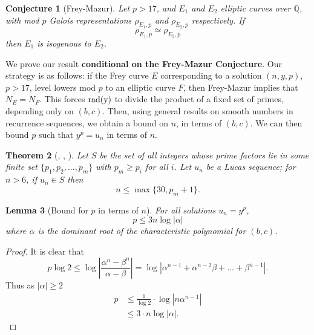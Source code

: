 \documentclass[12pt]{amsart}
\newtheorem{thm}{Theorem}[section]
\newtheorem{lem}[thm]{Lemma}
\newtheorem{conj}[thm]{Conjecture}
\theoremstyle{definition}
\def\Q{{\mathbb Q}}
\newcommand{\rad}{\rm rad}
\newcommand{\bfrac}[2]{\left| \frac{#1}{#2} \right|}
\begin{document}
\begin{conj}[Frey-Mazur]\label{FreyMazur}
Let $p > 17$, and $E_1$ and $E_2$ elliptic curves over $\Q$, with mod $p$ Galois representations $\rho_{E_1,p}$ and $\rho_{E_2,p}$ respectively.  If
\[ \rho_{E_1,p} \simeq \rho_{E_2,p} \]
then $E_1$ is isogenous to $E_2$.
\end{conj}

We prove our result \textbf{conditional on the Frey-Mazur Conjecture}. Our strategy is as follows: if the Frey curve $E$ corresponding to a solution $(n,y,p)$, $p > 17$, level lowers mod $p$ to an elliptic curve $F$, then Frey-Mazur implies that $N_E = N_F$. This forces $\rad(y)$ to divide the product of a fixed set of primes, depending only on $(b,c)$. Then, using general results on smooth numbers in recurrence sequences, we obtain a bound on $n$, in terms of $(b,c)$. We can then bound $p$ such that $y^p = u_n$ in terms of $n$.


\begin{thm}[\cite{gyory81}, \cite{gyory82}, \cite{gyory03}]\label{smoothterm}
Let $S$ be the set of all integers whose prime factors lie in some finite set $\{p_1,p_2,...,p_m\}$ with $p_m \geq p_i$ for all $i$.  Let $u_n$ be a Lucas sequence; for $n > 6$, if $u_n \in S$ then
\[ n \leq \max\{30, p_m +1 \}. \]
\end{thm}

\begin{lem}[Bound for $p$ in terms of $n$]\label{boundpintermsn}
For all solutions $u_n = y^p$, 
\[ p \leq 3n \log|\alpha|  \]
where $\alpha$ is the dominant root of the characteristic polynomial for $(b,c)$.
\end{lem}

\begin{proof}
It is clear that
\[p\log{2} \leq \log \bfrac{\alpha^n - \beta^n}{\alpha-\beta}  = \log|\alpha^{n-1}+ \alpha^{n-2}\beta+...+\beta^{n-1}|. \]
Thus as $|\alpha| \geq 2$
\begin{align*}
p & \leq  \frac{1}{\log{2}} \cdot \log|n\alpha^{n-1}| \\
 & \leq 3\cdot n \log|\alpha|.
\end{align*}
\end{proof}
\end{document}
